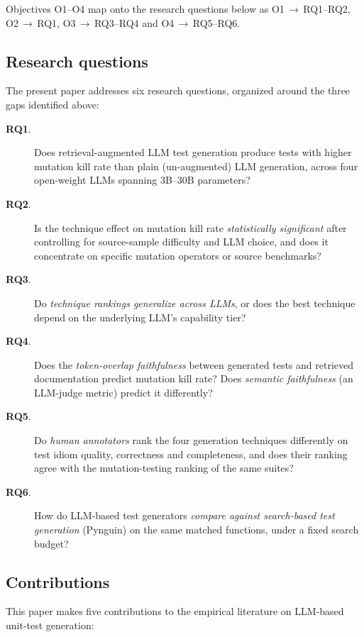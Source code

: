 \documentclass[smallextended]{svjour3}
\begin{document}
\noindent Objectives O1--O4 map onto the research questions below as
O1\,$\rightarrow$\,RQ1--RQ2, O2\,$\rightarrow$\,RQ1,
O3\,$\rightarrow$\,RQ3--RQ4 and O4\,$\rightarrow$\,RQ5--RQ6.

\subsection{Research questions}\label{sec:intro-rqs}

The present paper addresses six research questions, organized
around the three gaps identified above:

\begin{description}
\item[\textbf{RQ1}.] Does retrieval-augmented LLM test generation
 produce tests with higher mutation kill rate than plain
 (un-augmented) LLM generation, across four open-weight LLMs
 spanning 3B--30B parameters?
\item[\textbf{RQ2}.] Is the technique effect on mutation kill rate
 \emph{statistically significant} after controlling for
 source-sample difficulty and LLM choice, and does it concentrate
 on specific mutation operators or source benchmarks?
\item[\textbf{RQ3}.] Do \emph{technique rankings generalize across
 LLMs}, or does the best technique depend on the underlying LLM's
 capability tier?
\item[\textbf{RQ4}.] Does the \emph{token-overlap faithfulness}
 between generated tests and retrieved documentation predict
 mutation kill rate? Does \emph{semantic faithfulness} (an
 LLM-judge metric) predict it differently?
\item[\textbf{RQ5}.] Do \emph{human annotators} rank the four
 generation techniques differently on test idiom quality, correctness
 and completeness, and does their ranking agree with the
 mutation-testing ranking of the same suites?
\item[\textbf{RQ6}.] How do LLM-based test generators \emph{compare
 against search-based test generation} (Pynguin) on the same
 matched functions, under a fixed search budget?
\end{description}

\subsection{Contributions}\label{sec:intro-contrib}

This paper makes five contributions to the empirical literature on
LLM-based unit-test generation:
\end{document}
